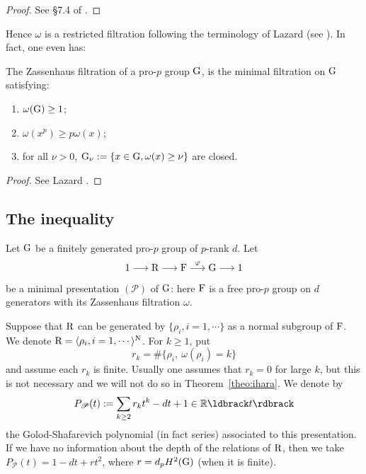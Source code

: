 \documentclass[12pt,a4paper,twoside,english]{smfart}
\def\Reel{{\mathbb R}}
\def\R{{\rm R}}
\def\G{{\rm G}}
\def\F{{\rm F}}
\def\PP{{\mathcal P}}
\begin{document}
\begin{proof} 
See \S 7.4 of \cite{Koch}.
\end{proof}

Hence $\omega$ is a restricted filtration following the terminology of Lazard (see \cite[Appendice A2, Definition 2.2 page 201]{Lazard}). In fact, one even has:
\begin{prop}
The Zassenhaus filtration of a pro-$p$ group $\G$,   is the minimal   filtration on $\G$ satisfying:
\begin{enumerate}
\item[$(i)$] $\omega(\G)\geq 1$; 
\item[$(ii)$] $\omega(x^p) \geq p \omega(x)$; 
\item[$(iii)$] for all $\nu>0$, $\G_\nu:=\{x\in \G, \omega(x)\geq \nu\}$ are closed. 
\end{enumerate}
\end{prop}

\begin{proof} See Lazard \cite[Appendice A2, Theorem 3.5 page 205]{Lazard}.
\end{proof}

\subsection{The inequality}

Let $\G$ be a finitely generated pro-$p$ group of $p$-rank $d$. Let 
$$1\longrightarrow \R \longrightarrow \F \stackrel{\varphi}{\longrightarrow} \G \longrightarrow 1$$ be a minimal presentation $(\PP)$ of $\G$: here $\F$ is a free pro-$p$ group on $d$ generators with its  Zassenhaus filtration $\omega$.

Suppose that $\R$ can be generated by $\{ \rho_i, i=1,\cdots \}$ as a normal subgroup of $\F$. We denote $\R=\langle  \rho_i, i=1,\cdots \rangle^{\rm N}$. For $k\geq 1$, put 
 $$r_k= \#\{ \rho_i, \ \omega(\rho_i)=k\}$$
and  assume each $r_k $ is finite.
Usually one assumes that $r_k=0$ for large $k$, but this is not necessary and we will not do so in Theorem~\ref{theo:ihara}.
 We denote by $$\displaystyle{P_\PP(t):=\sum_{k\geq 2} r_k t^k -dt+1  \in \Reel\ldbrack t \rdbrack }$$  the Golod-Shafarevich polynomial (in fact series)  associated to this presentation.
  If we have no information about the depth of the relations of $\R$, then we take $P_\PP(t)=1-dt+rt^2$, where $r=d_p H^2(\G)$ (when it is finite).
 
\end{document}
